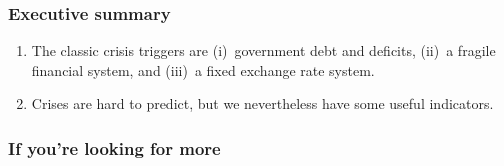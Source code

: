 \documentclass[letterpaper,12pt]{article}
\begin{document}
\subsubsection*{Executive summary}

\begin{enumerate}\itemsep=0.0in
\item The classic crisis triggers are
(i)~government debt and deficits,
(ii)~a fragile financial system,
and (iii)~a fixed exchange rate system.

\item Crises are hard to predict,
but we nevertheless have some useful indicators.

\end{enumerate}


\begin{comment}
\subsubsection*{Review questions}

\begin{enumerate}
\item {\it Country risk analysis.\/}
Make up your own:
collect data for any country of interest
and run through the same analysis we did
for Turkey.
\end{enumerate}
\end{comment}

\subsubsection*{If you're looking for more}
\end{document}
